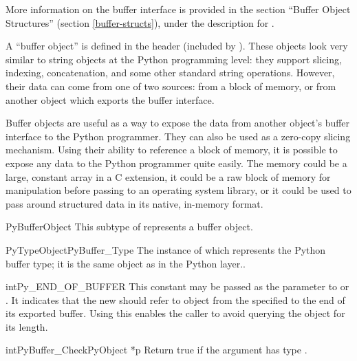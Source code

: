 \documentclass{manual}
\begin{document}
More information on the buffer interface is provided in the section
``Buffer Object Structures'' (section \ref{buffer-structs}), under
the description for .

A ``buffer object'' is defined in the  header
(included by ). These objects look very similar to
string objects at the Python programming level: they support slicing,
indexing, concatenation, and some other standard string
operations. However, their data can come from one of two sources: from
a block of memory, or from another object which exports the buffer
interface.

Buffer objects are useful as a way to expose the data from another
object's buffer interface to the Python programmer. They can also be
used as a zero-copy slicing mechanism. Using their ability to
reference a block of memory, it is possible to expose any data to the
Python programmer quite easily. The memory could be a large, constant
array in a C extension, it could be a raw block of memory for
manipulation before passing to an operating system library, or it
could be used to pass around structured data in its native, in-memory
format.

\begin{ctypedesc}{PyBufferObject}
This subtype of  represents a buffer object.
\end{ctypedesc}

\begin{cvardesc}{PyTypeObject}{PyBuffer_Type}
The instance of  which represents the Python
buffer type; it is the same object as  in the
Python layer..
\end{cvardesc}

\begin{cvardesc}{int}{Py_END_OF_BUFFER}
This constant may be passed as the  parameter to
 or
. It indicates that the new
 should refer to  object from the
specified  to the end of its exported buffer. Using this
enables the caller to avoid querying the  object for its
length.
\end{cvardesc}

\begin{cfuncdesc}{int}{PyBuffer_Check}{PyObject *p}
Return true if the argument has type .
\end{cfuncdesc}
\end{document}
